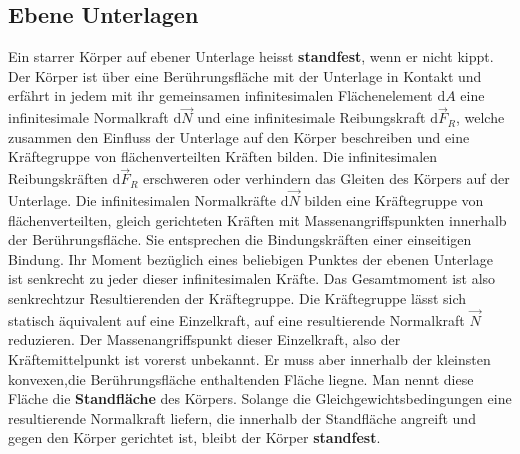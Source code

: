 \subsection{Ebene Unterlagen}
Ein starrer Körper auf ebener Unterlage heisst \textbf{standfest}, wenn er nicht kippt. Der Körper ist über eine Berührungsfläche mit der Unterlage in Kontakt und erfährt in jedem mit ihr gemeinsamen infinitesimalen Flächenelement $\text{d}A$ eine infinitesimale Normalkraft $\text{d}\overrightarrow{N}$ und eine infinitesimale Reibungskraft $\text{d}\overrightarrow{F}_R$, welche zusammen den Einfluss der Unterlage auf den Körper beschreiben und eine Kräftegruppe von flächenverteilten Kräften bilden.
\newline\newline
Die infinitesimalen Reibungskräften $\text{d}\overrightarrow{F}_R$ erschweren oder verhindern das Gleiten des Körpers auf der Unterlage. Die infinitesimalen Normalkräfte $\text{d}\overrightarrow{N}$ bilden eine Kräftegruppe von flächenverteilten, gleich gerichteten Kräften mit Massenangriffspunkten innerhalb der Berührungsfläche. Sie entsprechen die Bindungskräften einer einseitigen Bindung. Ihr Moment bezüglich eines beliebigen Punktes der ebenen Unterlage ist senkrecht zu jeder dieser infinitesimalen Kräfte. Das Gesamtmoment ist also senkrechtzur Resultierenden der Kräftegruppe. Die Kräftegruppe lässt sich statisch äquivalent auf eine Einzelkraft, auf eine resultierende Normalkraft $\overrightarrow{N}$ reduzieren. 
\newline\newline
Der Massenangriffspunkt dieser Einzelkraft, also der Kräftemittelpunkt ist vorerst unbekannt. Er muss aber innerhalb der kleinsten konvexen,die Berührungsfläche enthaltenden Fläche liegne. Man nennt diese Fläche die \textbf{Standfläche} des Körpers. Solange die Gleichgewichtsbedingungen eine resultierende Normalkraft liefern, die innerhalb der Standfläche angreift und gegen den Körper gerichtet ist, bleibt der Körper \textbf{standfest}.
